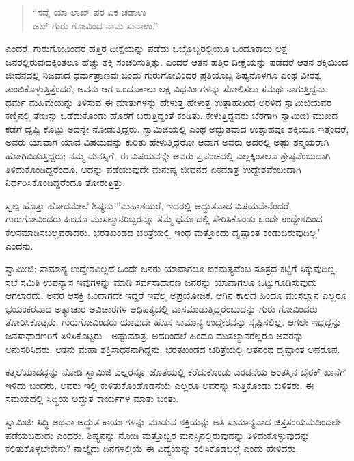 \begin{verse}
“ಸವೈ ಯಾ ಲಾಖ್ ಪರ ಏಕ ಚಡಾಉ\\ಜಬ್ ಗುರು ಗೋವಿಂದ ನಾಮ ಸುನಾಉ.”
\end{verse}

ಎಂದರೆ, ಗುರುಗೋವಿಂದರ ಹತ್ತಿರ ದೀಕ್ಷೆಯನ್ನು ಪಡೆದು ಒಬ್ಬೊಬ್ಬರಲ್ಲಿಯೂ ಒಂದೂಕಾಲು ಲಕ್ಷ ಜನರಲ್ಲಿರುವುದಕ್ಕಿಂತಲೂ ಹೆಚ್ಚು ಶಕ್ತಿ ಸಂಚರಿಸುತ್ತಿತ್ತು. ಎಂದರೆ ಆತನ ಹತ್ತಿರ ದೀಕ್ಷೆಯನ್ನು ಪಡೆದರೆ ಆತನ ಶಕ್ತಿಯಿಂದ ಜೀವನದಲ್ಲಿ ನಿಜವಾದ ಧರ್ಮಪ್ರಾಣವು ಬಂದು ಗುರುಗೋವಿಂದರ ಪ್ರತಿಯೊಬ್ಬ ಶಿಷ್ಯನೊಳಗೂ ಎಂಥ ವೀರತ್ವ ತುಂಬಿಕೊಳ್ಳುತ್ತಿತ್ತೆಂದರೆ, ಅವನು ಆಗ ಒಂದೂಕಾಲು ಲಕ್ಷ ವಿಧರ್ಮಿಗಳನ್ನು ಸೋಲಿಸಲು ಸಮರ್ಥನಾಗುತ್ತಿದ್ದನು. ಧರ್ಮ ಮಹಿಮೆಯನ್ನು ತಿಳಿಸುವ ಈ ಮಾತುಗಳನ್ನು ಹೇಳುತ್ತ ಹೇಳುತ್ತ ಉತ್ಸಾಹದಿಂದ ಅರಳಿದ ಸ್ವಾಮಿಜಿಯವರ ಕಣ್ಣಿನಲ್ಲಿ ತೇಜಸ್ಸು ಒಡೆದುಕೊಂಡು ಹೊರಗೆ ಬರುತ್ತಿದ್ದಂತೆ ಕಂಡಿತು. ಕೇಳುತ್ತಿದ್ದವರು ಬೆರಗಾಗಿ ಸ್ವಾಮೀಜಿ ಮುಖದ ಕಡೆಗೆ ದೃಷ್ಟಿ ಕೊಟ್ಟು ಅದನ್ನೇ ನೋಡುತ್ತಿದ್ದರು. ಸ್ವಾಮಿಜಿಯಲ್ಲಿ ಎಂಥ ಅದ್ಭುತವಾದ ಉತ್ಸಾಹವೂ ಶಕ್ತಿಯೂ ಇತ್ತೆಂದರೆ, ಅವರು ಯಾವಾಗ ಯಾವ ವಿಷಯವನ್ನು ಕುರಿತು ಹೇಳುತ್ತಿದ್ದರೋ ಆವಾಗ ಅವರು ಅದರಲ್ಲಿ ಅಷ್ಟು ತನ್ಮಯರಾಗಿ ಹೋಗಿಬಿಡುತ್ತಿದ್ದರು; ನಮ್ಮ ಮನಸ್ಸಿಗೆ, ಈ ವಿಷಯವನ್ನೇ ಅವರು ಪ್ರಪಂಚದಲ್ಲಿ ಎಲ್ಲಕ್ಕಿಂತಲೂ ಶ್ರೇಷ್ಠವೆಂಬುದಾಗಿ ತಿಳಿದುಕೊಂಡಿದ್ದರೆಂದೂ, ಅದನ್ನು ಪಡೆಯುವುದೇ ಮನುಷ್ಯ ಜೀವನದ ಏಕಮಾತ್ರ ಉದ್ದೇಶವೆಂಬುದಾಗಿ ನಿರ್ಧರಿಸಿಕೊಂಡಿದ್ದರೆಂದೂ ತೋರುತ್ತಿತ್ತು.

ಸ್ವಲ್ಪ ಹೊತ್ತು ಹೋದಮೇಲೆ ಶಿಷ್ಯನು “ಮಹಾಶಯರೆ, ಇದರಲ್ಲಿ ಅದ್ಭುತವಾದ ವಿಷಯವೇನೆಂದರೆ, ಗುರುಗೋವಿಂದರು ಹಿಂದೂ ಮುಸಲ್ಮಾನರಿಬ್ಬರನ್ನೂ ತಮ್ಮ ಧರ್ಮದಲ್ಲಿ ಸೇರಿಸಿಕೊಂಡು ಒಂದೇ ಉದ್ದೇಶದಿಂದ ಕೆಲಸಮಾಡಿಸಬಲ್ಲವರಾದರು. ಭರತಖಂಡದ ಚರಿತ್ರೆಯಲ್ಲಿ ಇಂಥ ಮತ್ತೊಂದು ದೃಷ್ಟಾಂತ ಕಂಡುಬರುವುದಿಲ್ಲ" ಎಂದನು.

ಸ್ವಾಮೀಜಿ: ಸಾಮಾನ್ಯ ಉದ್ದೇಶವಿಲ್ಲದೆ ಒಂದೇ ಜನರು ಯಾವಾಗಲೂ ಐಕಮತ್ಯವೆಂಬ ಸೂತ್ರದ ಕಟ್ಟಿಗೆ ಸಿಕ್ಕುವುದಿಲ್ಲ. ಸಭೆ ಸಮಿತಿ ಉಪನ್ಯಾಸ ಇವುಗಳನ್ನು ಮಾಡಿ ಸರ್ವಸಾಧಾರಣ ಜನರನ್ನು ಯಾವಾಗಲೂ ಒಟ್ಟುಗೂಡಿಸುವುದು ಆಗಲಾರದು. ಅವರ ಆಸಕ್ತಿ ಒಂದಾಗದೇ ಇದ್ದರೆ ಇವೆಲ್ಲ ಅಪ್ರಯೋಜಕ. ಆಗಿನ ಕಾಲದ ಹಿಂದೂ ಮುಸಲ್ಮಾನ ಎಲ್ಲರೂ ಭಯಂಕರವಾದ ಅತ್ಯಾಚಾರ ಅವಿಚಾರಗಳ ಆಧಿಪತ್ಯದಲ್ಲಿ ವಾಸಮಾಡುತ್ತಿದ್ದರೆಂಬುದನ್ನು ಗುರು ಗೋವಿಂದರು ತೋರಿಸಿಕೊಟ್ಟರು. ಗುರುಗೋವಿಂದರು ಯಾವುದೇ ಹೊಸ ಸಾಮಾನ್ಯ ಉದ್ದೇಶವನ್ನು ಸೃಷ್ಟಿಸಲಿಲ್ಲ. ಆಗಲೇ ಇದ್ದದ್ದನ್ನು ಜನಸಾಧಾರಣರಿಗೆ ತಿಳಿಸಿಕೊಟ್ಟರು - ಅಷ್ಟುಮಾತ್ರ. ಅದರಿಂದಲೆ ಹಿಂದೂ ಮುಸಲ್ಮಾನರೆಲ್ಲರೂ ಅವರನ್ನು ಅನುಸರಿಸಿದರು. ಆತನು ಮಹಾ ಶಕ್ತಿಸಾಧಕನಾಗಿದ್ದನು. ಭರತಖಂಡದ ಚರಿತ್ರೆಯಲ್ಲಿ ಆತನಂಥ ದೃಷ್ಟಾಂತ ಅಪರೂಪ.

ಕತ್ತಲೆಯಾದದ್ದನ್ನು ನೋಡಿ ಸ್ವಾಮಿಜಿ ಎಲ್ಲರನ್ನೂ ಜೊತೆಯಲ್ಲಿ ಕರೆದುಕೊಂಡು ಎರಡನೆಯ ಅಂತಸ್ತಿನ ಬೈಠಕ್ ಖಾನೆಗೆ ಇಳಿದು ಬಂದರು. ಅವರು ಇಲ್ಲಿ ಕುಳಿತುಕೊಂಡೊಡನೆಯೆ ಎಲ್ಲರೂ ಅವರನ್ನು ಸುತ್ತಿಕೊಂಡು ಕುಳಿತರು. ಈ ಸಮಯದಲ್ಲಿ ಸಿದ್ಧಿಯ ಅದ್ಭುತ ಕಾರ್ಯಗಳ ಮಾತು ಬಂತು.

ಸ್ವಾಮಿಜಿ: ಸಿದ್ಧಿ ಅಥವಾ ಅದ್ಭುತ ಕಾರ್ಯಗಳನ್ನು ಮಾಡುವ ಶಕ್ತಿಯನ್ನು ಅತಿ ಸಾಮಾನ್ಯವಾದ ಚಿತ್ತಸಂಯಮದಿಂದಲೇ ಪಡೆಯಬಹುದು ಎಂದರು. ಶಿಷ್ಯನನ್ನು ನೋಡಿ ಮತ್ತೊಬ್ಬರ ಮನಸ್ಸಿನಲ್ಲಿರುವುದನ್ನು ತಿಳಿದುಕೊಳ್ಳುವುದನ್ನು ಕಲಿತುಕೊಳ್ಳಬೇಕೇನು? ನಾಲ್ಕೈದು ದಿನಗಳಲ್ಲಿಯೆ ಈ ವಿದ್ಯೆಯನ್ನು ಕಲಿಸಿಕೊಡಬಲ್ಲೆ ಎಂದು ಹೇಳಿದರು.

